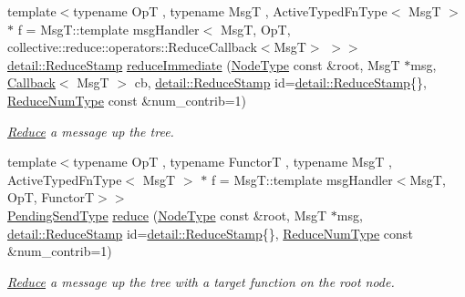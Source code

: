 \begin{DoxyCompactItemize}
{\footnotesize template$<$typename OpT , typename MsgT , Active\+Typed\+Fn\+Type$<$ Msg\+T $>$ $\ast$ f = Msg\+T\+::template msg\+Handler$<$      Msg\+T, Op\+T, collective\+::reduce\+::operators\+::\+Reduce\+Callback$<$\+Msg\+T$>$    $>$$>$ }\\\hyperlink{namespacevt_1_1collective_1_1reduce_1_1detail_aacc1fcd729d934ba143fee3a943bf9e7}{detail\+::\+Reduce\+Stamp} \hyperlink{structvt_1_1collective_1_1reduce_1_1_reduce_a6c7cea8e7fe0d296db87e74189e93110}{reduce\+Immediate} (\hyperlink{namespacevt_a866da9d0efc19c0a1ce79e9e492f47e2}{Node\+Type} const \&root, MsgT $\ast$msg, \hyperlink{namespacevt_a36db99df4c973d48b1118a293fff533f}{Callback}$<$ MsgT $>$ cb, \hyperlink{namespacevt_1_1collective_1_1reduce_1_1detail_aacc1fcd729d934ba143fee3a943bf9e7}{detail\+::\+Reduce\+Stamp} id=\hyperlink{namespacevt_1_1collective_1_1reduce_1_1detail_aacc1fcd729d934ba143fee3a943bf9e7}{detail\+::\+Reduce\+Stamp}\{\}, \hyperlink{structvt_1_1collective_1_1reduce_1_1_reduce_a6c3e63aca10c31d2823b0b18cf9762a4}{Reduce\+Num\+Type} const \&num\+\_\+contrib=1)
\begin{DoxyCompactList}\small\item\em \hyperlink{structvt_1_1collective_1_1reduce_1_1_reduce}{Reduce} a message up the tree. \end{DoxyCompactList}\item 
{\footnotesize template$<$typename OpT , typename FunctorT , typename MsgT , Active\+Typed\+Fn\+Type$<$ Msg\+T $>$ $\ast$ f = Msg\+T\+::template msg\+Handler$<$\+Msg\+T, Op\+T, Functor\+T$>$$>$ }\\\hyperlink{structvt_1_1collective_1_1reduce_1_1_reduce_a0474b491f3c93014d9a0ce0356c6bfd5}{Pending\+Send\+Type} \hyperlink{structvt_1_1collective_1_1reduce_1_1_reduce_a1b5753c2a9b1ce49415d313752f720aa}{reduce} (\hyperlink{namespacevt_a866da9d0efc19c0a1ce79e9e492f47e2}{Node\+Type} const \&root, MsgT $\ast$msg, \hyperlink{namespacevt_1_1collective_1_1reduce_1_1detail_aacc1fcd729d934ba143fee3a943bf9e7}{detail\+::\+Reduce\+Stamp} id=\hyperlink{namespacevt_1_1collective_1_1reduce_1_1detail_aacc1fcd729d934ba143fee3a943bf9e7}{detail\+::\+Reduce\+Stamp}\{\}, \hyperlink{structvt_1_1collective_1_1reduce_1_1_reduce_a6c3e63aca10c31d2823b0b18cf9762a4}{Reduce\+Num\+Type} const \&num\+\_\+contrib=1)
\begin{DoxyCompactList}\small\item\em \hyperlink{structvt_1_1collective_1_1reduce_1_1_reduce}{Reduce} a message up the tree with a target function on the root node. \end{DoxyCompactList}\item 

\end{DoxyCompactItemize}
